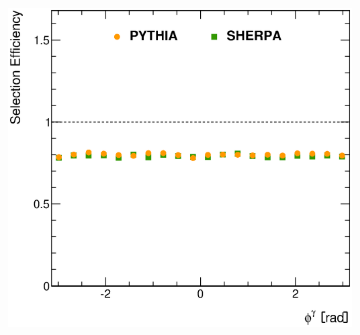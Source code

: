 \documentclass[12pt, twoside]{article}
\numberwithin{equation}{section}
\numberwithin{figure}{section}
\newenvironment{changemargin}[2]{%
\begin{list}{}{%
\setlength{\topsep}{0pt}%
\setlength{\leftmargin}{#1}%
\setlength{\rightmargin}{#2}%
\setlength{\listparindent}{\parindent}%
\setlength{\itemindent}{\parindent}%
\setlength{\parsep}{\parskip}%
}%
\item[]}{\end{list}}
\begin{document}
\begin{figure}
\begin{changemargin}{-1.0cm}{-0.75cm}
\begin{changemargin}{-0.75cm}{-1.0cm}
\begin{subfigure}[b]{0.37\textwidth}
            \subcaption{}
            \label{fig:SelectionEfficienciesEtaPhoton}
        \end{subfigure}
        \begin{subfigure}[b]{0.37\textwidth}
            \includegraphics[width=\textwidth]{./images/SelectionEfficiencies/EFF-103.eps}
            \subcaption{}
            \label{fig:SelectionEfficienciesPhiPhoton}
        \end{subfigure}


\end{changemargin}
\end{changemargin}
\end{figure}
\end{document}

